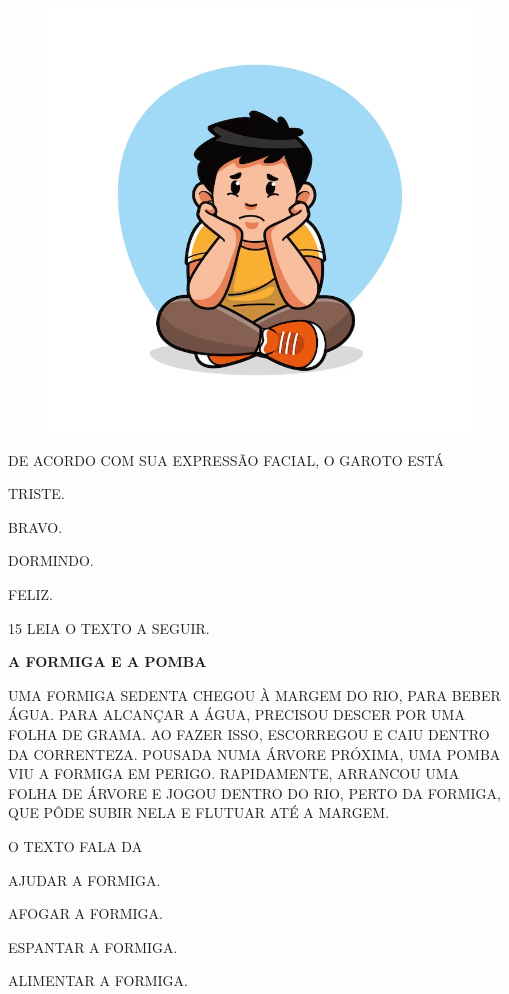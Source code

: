 \begin{figure}[H]
\centering
\includegraphics[width=.6\textwidth]{./media/image237.png}
\end{figure}

DE ACORDO COM SUA EXPRESSÃO FACIAL, O GAROTO ESTÁ

\begin{escolha}

\item TRISTE.

\item BRAVO.

\item DORMINDO.

\item FELIZ.

\end{escolha}

\num{15} LEIA O TEXTO A SEGUIR.

\begin{myquote}
\textbf{A FORMIGA E A POMBA}

UMA FORMIGA SEDENTA CHEGOU À MARGEM DO RIO, PARA BEBER
ÁGUA. PARA ALCANÇAR A ÁGUA, PRECISOU DESCER POR UMA FOLHA DE
GRAMA. AO FAZER ISSO, ESCORREGOU E CAIU DENTRO DA CORRENTEZA.
POUSADA NUMA ÁRVORE PRÓXIMA, UMA POMBA VIU A
FORMIGA EM PERIGO. RAPIDAMENTE, ARRANCOU UMA FOLHA DE
ÁRVORE E JOGOU DENTRO DO RIO, PERTO DA FORMIGA, QUE PÔDE SUBIR
NELA E FLUTUAR ATÉ A MARGEM.

\end{myquote}

O TEXTO FALA DA

\begin{escolha}

\item AJUDAR A FORMIGA.

\item AFOGAR A FORMIGA.

\item ESPANTAR A FORMIGA.

\item ALIMENTAR A FORMIGA.

\end{escolha}

